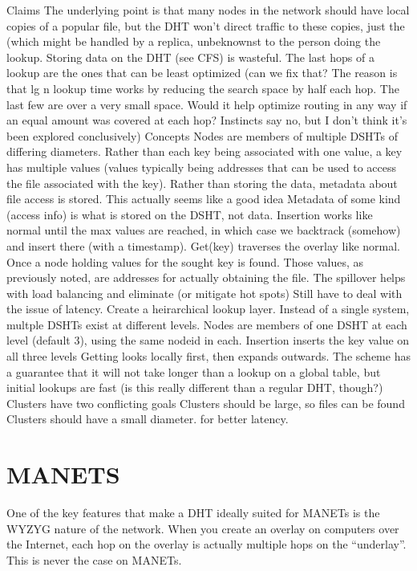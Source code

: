 \documentclass[10pt,letterpaper]{report}
\begin{document}
Claims
The underlying point is  that many nodes in the network should have local copies of a popular file, but the DHT won't direct traffic to these copies, just the  (which  might be handled by a replica, unbeknownst to the person doing the lookup.
Storing data on the DHT (see CFS) is wasteful.
The last hops of a lookup are the ones that can be least optimized (can we fix that?  The reason is that lg n lookup time works by reducing the search space by half each hop.  The last few are over a very small space.  Would it help optimize routing in any way if an equal amount was covered at each hop?  Instincts say no, but I don't think it's been explored conclusively)
Concepts
Nodes are members of multiple DSHTs of differing diameters. 
Rather than each key being associated with one value, a key has multiple values (values typically being addresses that can be used to access the file associated with the key).  Rather than storing the data, metadata about file access is stored.  This actually seems like a good idea
Metadata of some kind (access info) is what is stored on the DSHT, not data.
Insertion works like normal until the max values are reached, in which  case we backtrack (somehow) and insert there (with a timestamp).
Get(key) traverses the overlay like normal.  Once a node holding values for the sought key is found.  Those values, as previously noted, are addresses for actually obtaining the file. 
The spillover helps with load balancing and eliminate (or mitigate hot spots)
Still have to deal with the issue of latency.  Create a heirarchical lookup layer.
Instead of a single system, multple DSHTs exist at different levels.
Nodes are members of one  DSHT at each level (default 3), using the same nodeid in each.
Insertion inserts the key value on all three levels 
Getting looks locally first, then expands outwards.  The scheme has a guarantee that it will not take longer than a lookup on a  global table, but initial lookups are fast  (is this really different than a regular DHT, though?)
Clusters have two conflicting goals
Clusters should be large, so files can be found
Clusters should have a small diameter. for better latency.






\chapter{MANETS}
One of the key features that make a DHT ideally suited for MANETs is the WYZYG nature of the network.  When you create an overlay on computers over the Internet, each hop on the overlay is actually multiple hops on the ``underlay''.  This is never the case on MANETs.



\end{document}
